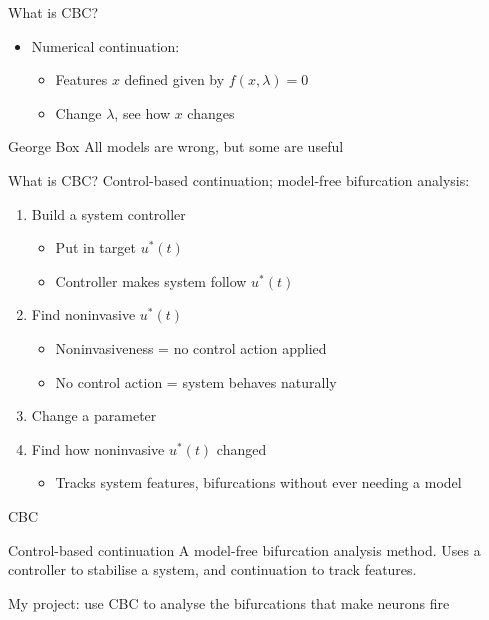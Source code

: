 \documentclass[presentation]{beamer}
\begin{document}
\begin{frame}[label={sec:org0cdda59}]{What is CBC?}
\begin{itemize}
\item Numerical continuation:
\begin{itemize}
\item Features \(x\) defined given by \(f(x, \lambda)=0\)
\item Change \(\lambda\), see how \(x\) changes
\end{itemize}
\end{itemize}

\vfill

\begin{block}{George Box}
All models are wrong, but some are useful
\end{block}
\end{frame}

\begin{frame}[label={sec:org8772d36}]{What is CBC?}
Control-based continuation; model-free bifurcation analysis:
\begin{enumerate}[<+->]
\item Build a system controller
\begin{itemize}
\item Put in target \(u^*(t)\)
\item Controller makes system follow \(u^*(t)\)
\end{itemize}
\item Find noninvasive \(u^*(t)\)
\begin{itemize}
\item Noninvasiveness = no control action applied
\item No control action = system behaves naturally
\end{itemize}
\item Change a parameter
\item Find how noninvasive \(u^*(t)\) changed
\begin{itemize}
\item Tracks system features, bifurcations without ever needing a model
\end{itemize}
\end{enumerate}
\end{frame}
\begin{frame}[label={sec:orgfc8154a}]{CBC}
\begin{block}{Control-based continuation}
A model-free bifurcation analysis method. Uses a controller to stabilise a system, and continuation to track features.
\end{block}

\vfill
My project: use CBC to analyse the bifurcations that make neurons fire
\end{frame}
\end{document}
